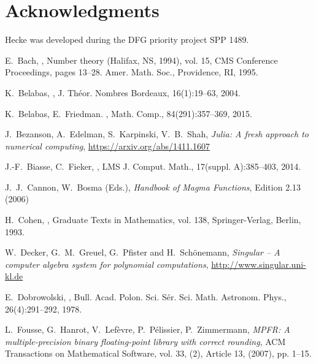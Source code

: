 \documentclass{sig-alternate-05-2015}
\begin{document}
\section{Acknowledgments}

Hecke was developed during the DFG priority project SPP 1489.

\begin{thebibliography}{99}

E.~Bach,
,
\newblock Number theory ({H}alifax, {NS}, 1994), vol. 15, CMS
  Conference Proceedings, pages 13--28. Amer. Math. Soc., Providence, RI, 1995.

K.~Belabas,
,
\newblock J. Th\'eor. Nombres Bordeaux, 16(1):19--63, 2004.

K.~Belabas, E.~Friedman.
,
\newblock Math. Comp., 84(291):357--369, 2015.

J.~Bezanson, A.~Edelman, S.~Karpinski, V.~B.~Shah, {\em Julia: A fresh approach to numerical computing}, \url{https://arxiv.org/abs/1411.1607}

J.-F.~Biasse, C.~Fieker,
,
\newblock LMS J. Comput. Math., 17(suppl. A):385--403, 2014.

J.~J.~Cannon, W.~Bosma (Eds.), {\em Handbook of Magma Functions}, Edition 2.13 (2006)

H.~Cohen,
,
  Graduate Texts in Mathematics, vol. 138,
\newblock Springer-Verlag, Berlin, 1993.

W.~Decker, G.~M.~Greuel, G.~Pfister and H.~Sch\"onemann, {\em Singular -- A computer algebra system for polynomial computations}, \url{http://www.singular.uni-kl.de}

E.~Dobrowolski,
,
\newblock Bull. Acad. Polon. Sci. S\'er. Sci. Math. Astronom. Phys.,
  26(4):291--292, 1978.

L.~Fousse, G.~Hanrot, V.~Lef\`{e}vre, P.~P\'{e}lissier, P.~Zimmermann, {\em MPFR: A multiple-precision
binary floating-point library with correct rounding}, ACM Transactions on Mathematical Software, vol. 33, (2), Article 13, (2007), pp. 1--15.


\end{thebibliography}
\end{document}
